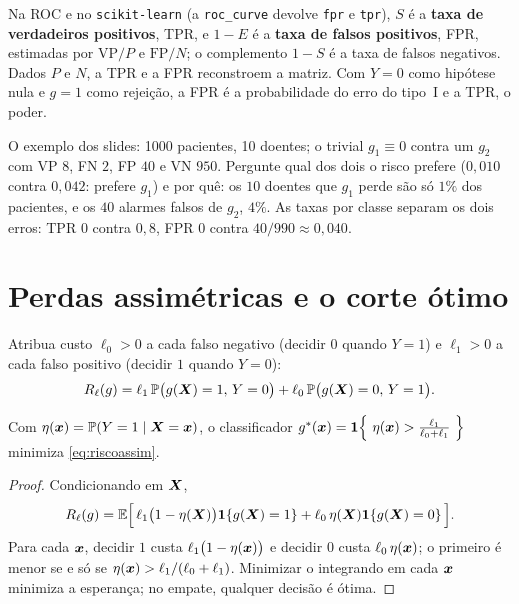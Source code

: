 \documentclass[11pt,a4paper]{article}
\begin{document}
Na ROC e no \texttt{scikit-learn} (a \texttt{roc\_curve} devolve \texttt{fpr} e
\texttt{tpr}), $S$ é a \textbf{taxa de verdadeiros positivos}, TPR, e $1-E$ é a
\textbf{taxa de falsos positivos}, FPR, estimadas por $\text{VP}/P$ e $\text{FP}/N$;
o complemento $1-S$ é a taxa de falsos negativos. Dados $P$ e $N$, a TPR e a FPR
reconstroem a matriz. Com $Y=0$ como hipótese nula e $g=1$ como rejeição, a FPR é a
probabilidade do erro do tipo~I e a TPR, o poder.

\begin{emsala}
O exemplo dos slides: 1000 pacientes, 10 doentes; o trivial $g_1\equiv0$ contra um
$g_2$ com VP $8$, FN $2$, FP $40$ e VN $950$. Pergunte qual dos dois o risco prefere
($0{,}010$ contra $0{,}042$: prefere $g_1$) e por quê: os $10$ doentes que $g_1$
perde são só $1\%$ dos pacientes, e os $40$ alarmes falsos de $g_2$, $4\%$. As taxas
por classe separam os dois erros: TPR $0$ contra $0{,}8$, FPR $0$ contra
$40/990\approx0{,}040$.
\end{emsala}

\section{Perdas assimétricas e o corte ótimo}\label{sec:custos}
Atribua custo $\ell_0>0$ a cada falso negativo (decidir $0$ quando $Y=1$) e
$\ell_1>0$ a cada falso positivo (decidir $1$ quando $Y=0$):
\begin{equation}\label{eq:riscoassim}
  R_\ell(g)=\ell_1\,\mathbb{P}\big(g(\bm{X})=1,\,Y=0\big)
                +\ell_0\,\mathbb{P}\big(g(\bm{X})=0,\,Y=1\big).
\end{equation}

\begin{proposicao}\label{prop:corte}
Com $\eta(\bm{x})=\mathbb{P}(Y=1\mid\bm{X}=\bm{x})$, o classificador
$g^*(\x)=\1{\ \eta(\x)>\tfrac{\ell_1}{\ell_0+\ell_1}\ }$ minimiza \eqref{eq:riscoassim}.
\end{proposicao}
\begin{proof}
Condicionando em $\bm{X}$,
\[
  R_\ell(g)=\mathbb{E}\Big[\,\ell_1\big(1-\eta(\bm{X})\big)\mathbf{1}\!\left\{g(\bm{X})=1\right\}
                +\ell_0\,\eta(\bm{X})\mathbf{1}\!\left\{g(\bm{X})=0\right\}\Big].
\]
Para cada $\bm{x}$, decidir $1$ custa $\ell_1\big(1-\eta(\bm{x})\big)$ e decidir $0$ custa
$\ell_0\,\eta(\bm{x})$; o primeiro é menor se e só se $\eta(\bm{x})>\ell_1/(\ell_0+\ell_1)$.
Minimizar o integrando em cada $\bm{x}$ minimiza a esperança; no empate, qualquer decisão
é ótima.
\end{proof}
\end{document}
